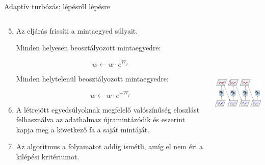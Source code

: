 \documentclass[english, aspectratio=169]{beamer}
\begin{document}
\begin{frame}{Adaptív turbózás: lépésről lépésre}
\begin{columns}
\begin{column}{.6\textwidth}
\begin{enumerate}
	\setcounter{enumi}{4}
	\item Az eljárás frissíti a mintaegyed súlyait.\par\smallskip 
	Minden helyesen beosztályozott mintaegyedre:
	\begin{block}{}
	\vspace{-0.2cm}
	\[
	w \leftarrow w \cdot e^{W_j}
	\]
	\end{block}
	Minden helytelenül beosztályozott mintaegyedre:
	\begin{block}{}
	\vspace{-0.2cm}
	\[
	w \leftarrow w \cdot e^{-W_j}
	\]
	\end{block}
	\item A létrejött egyedsúlyoknak megfelelő valószínűség eloszlást felhasználva az adathalmaz újramintázódik és eszerint kapja meg a következő fa a saját mintáját. 
	\item Az algoritmus a folyamatot addig ismétli, amíg el nem éri a kilépési kritériumot.
\end{enumerate}
\end{column}
\begin{column}{.4\textwidth}
\begin{center}
\includegraphics[width=6cm, height=7cm, keepaspectratio]{images/ensemble_7.png}
\end{center}
\end{column}
\end{columns}
\end{frame}
\end{document}
